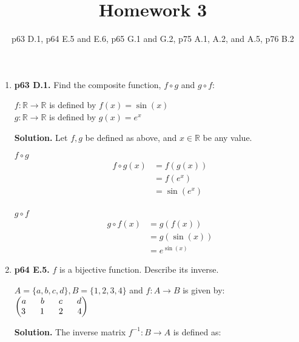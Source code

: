 \documentclass[11pt]{article}
\begin{document}
\title{Homework 3}
\date{p63 D.1, p64 E.5 and E.6, p65 G.1 and G.2, p75 A.1, A.2, and A.5, p76 B.2}
\maketitle

\thispagestyle{fancy}  
\pagestyle{fancy}      

\begin{enumerate}

\item {\bfseries p63 D.1.} Find the composite function, $f \circ g$ and $g \circ f$:

	$f : \mathbb{R} \rightarrow \mathbb{R}$ is defined by $f(x) = \sin(x)$ \\
	$g : \mathbb{R} \rightarrow \mathbb{R}$ is defined by $g(x) = e^x$
  
	{\bfseries Solution.} Let $f, g$ be defined as above, and $x \in \mathbb{R}$ be any value.
	
	$f \circ g$
	\begin{align*}
		f \circ g (x) &= f(g(x)) \\
		&= f(e^x) \\
		&= \sin(e^x) \\
	\end{align*}
	
	$g \circ f$
	\begin{align*}
		g \circ f (x) &= g(f(x)) \\
		&= g(\sin(x)) \\
		&= e^{\sin(x)}
	\end{align*}

\item {\bfseries p64 E.5.} $f$ is a bijective function. Describe its inverse.

	$A = \{a,b,c,d\}, B = \{1,2,3,4\}$ and $f : A \rightarrow B$ is given by: \\
	$\begin{pmatrix}
		a \hspace{6mm} b \hspace{6mm} c \hspace{6mm} d \\
		3 \hspace{6mm} 1 \hspace{6mm} 2 \hspace{6mm} 4 \\
	\end{pmatrix}$
  
	{\bfseries Solution.} The inverse matrix $f^{-1}: B \rightarrow A$ is defined as:
	

\end{enumerate}
\end{document}
